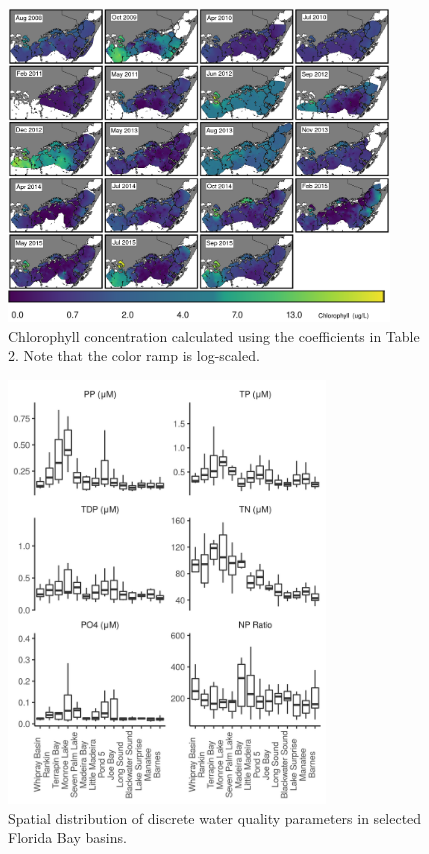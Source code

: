 \clearpage

\begin{figure}
  \centering
  \includegraphics[width=0.9\textwidth]{../../figures/multipanel.png}
  \caption{Chlorophyll concentration calculated using the coefficients in Table 2. Note that the color ramp is log-scaled.}
  \label{fig:4}
\end{figure}

\clearpage



\clearpage

\begin{figure}
  \centering
  \includegraphics[width=0.75\textwidth]{../../figures/nonchlboxplot.png}
  \caption{Spatial distribution of discrete water quality parameters in selected Florida Bay basins.}
  \label{fig:5}
\end{figure}

